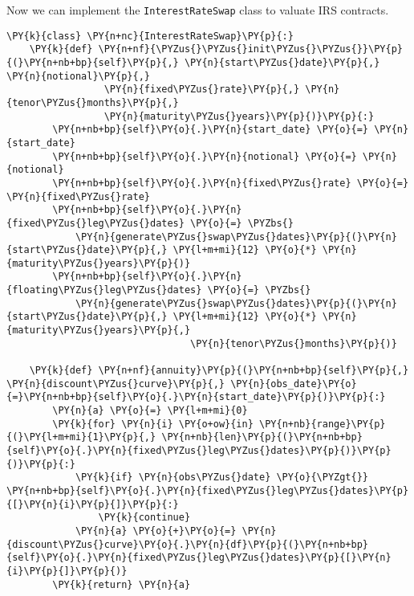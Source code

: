 Now we can implement the \texttt{InterestRateSwap} class to valuate IRS
contracts.

\begin{codebox}[breakable, size=fbox, boxrule=1pt, pad at break*=1mm,colback=cellbackground, colframe=cellborder]
\begin{Verbatim}[commandchars=\\\{\}]
\PY{k}{class} \PY{n+nc}{InterestRateSwap}\PY{p}{:}    
    \PY{k}{def} \PY{n+nf}{\PYZus{}\PYZus{}init\PYZus{}\PYZus{}}\PY{p}{(}\PY{n+nb+bp}{self}\PY{p}{,} \PY{n}{start\PYZus{}date}\PY{p}{,} \PY{n}{notional}\PY{p}{,} 
                 \PY{n}{fixed\PYZus{}rate}\PY{p}{,} \PY{n}{tenor\PYZus{}months}\PY{p}{,} 
                 \PY{n}{maturity\PYZus{}years}\PY{p}{)}\PY{p}{:}
        \PY{n+nb+bp}{self}\PY{o}{.}\PY{n}{start_date} \PY{o}{=} \PY{n}{start_date}
        \PY{n+nb+bp}{self}\PY{o}{.}\PY{n}{notional} \PY{o}{=} \PY{n}{notional}
        \PY{n+nb+bp}{self}\PY{o}{.}\PY{n}{fixed\PYZus{}rate} \PY{o}{=} \PY{n}{fixed\PYZus{}rate}
        \PY{n+nb+bp}{self}\PY{o}{.}\PY{n}{fixed\PYZus{}leg\PYZus{}dates} \PY{o}{=} \PYZbs{}
            \PY{n}{generate\PYZus{}swap\PYZus{}dates}\PY{p}{(}\PY{n}{start\PYZus{}date}\PY{p}{,} \PY{l+m+mi}{12} \PY{o}{*} \PY{n}{maturity\PYZus{}years}\PY{p}{)}
        \PY{n+nb+bp}{self}\PY{o}{.}\PY{n}{floating\PYZus{}leg\PYZus{}dates} \PY{o}{=} \PYZbs{}
            \PY{n}{generate\PYZus{}swap\PYZus{}dates}\PY{p}{(}\PY{n}{start\PYZus{}date}\PY{p}{,} \PY{l+m+mi}{12} \PY{o}{*} \PY{n}{maturity\PYZus{}years}\PY{p}{,}
                                \PY{n}{tenor\PYZus{}months}\PY{p}{)}
        
    \PY{k}{def} \PY{n+nf}{annuity}\PY{p}{(}\PY{n+nb+bp}{self}\PY{p}{,} \PY{n}{discount\PYZus{}curve}\PY{p}{,} \PY{n}{obs_date}\PY{o}{=}\PY{n+nb+bp}{self}\PY{o}{.}\PY{n}{start_date}\PY{p}{)}\PY{p}{:}
        \PY{n}{a} \PY{o}{=} \PY{l+m+mi}{0}
        \PY{k}{for} \PY{n}{i} \PY{o+ow}{in} \PY{n+nb}{range}\PY{p}{(}\PY{l+m+mi}{1}\PY{p}{,} \PY{n+nb}{len}\PY{p}{(}\PY{n+nb+bp}{self}\PY{o}{.}\PY{n}{fixed\PYZus{}leg\PYZus{}dates}\PY{p}{)}\PY{p}{)}\PY{p}{:}
            \PY{k}{if} \PY{n}{obs\PYZus{}date} \PY{o}{\PYZgt{}} \PY{n+nb+bp}{self}\PY{o}{.}\PY{n}{fixed\PYZus{}leg\PYZus{}dates}\PY{p}{[}\PY{n}{i}\PY{p}{]}\PY{p}{:}
                \PY{k}{continue}
            \PY{n}{a} \PY{o}{+}\PY{o}{=} \PY{n}{discount\PYZus{}curve}\PY{o}{.}\PY{n}{df}\PY{p}{(}\PY{n+nb+bp}{self}\PY{o}{.}\PY{n}{fixed\PYZus{}leg\PYZus{}dates}\PY{p}{[}\PY{n}{i}\PY{p}{]}\PY{p}{)}
        \PY{k}{return} \PY{n}{a}


\end{Verbatim}
\end{codebox}
